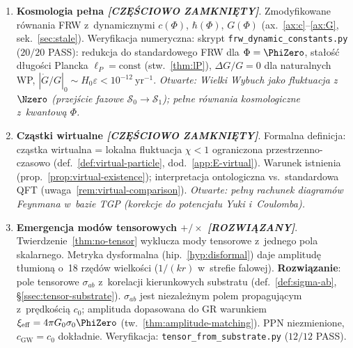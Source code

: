 \begin{enumerate}[label=\textbf{O\arabic*}., start=9, nosep]
  \item \textbf{Kosmologia pe\l{}na
        \emph{[CZ\k{E}\'SCIOWO ZAMKNI\k{E}TY]}}.
        Zmodyfikowane r\'ownania FRW z~dynamicznymi $c(\Phi)$,
        $\hbar(\Phi)$, $G(\Phi)$ (ax.~\ref{ax:c}--\ref{ax:G},
        sek.~\ref{sec:stale}).
        Weryfikacja numeryczna: skrypt
        \texttt{frw\_dynamic\_constants.py} ($20/20$ PASS):
        redukcja do standardowego FRW dla $\Phi=\PhiZero$,
        sta\l{}o\'s\'c d\l{}ugo\'sci Plancka $\ell_P = \mathrm{const}$
        (stw.~\ref{thm:lP}), $\Delta G/G = 0$ dla naturalnych WP,
        $|\dot G/G|_0 \sim H_0\varepsilon < 10^{-12}\ \mathrm{yr}^{-1}$.
        \emph{Otwarte: Wielki Wybuch jako fluktuacja z~$\Nzero$
        (przej\'scie fazowe $\mathcal{S}_0 \to \mathcal{S}_1$);
        pe\l{}ne r\'ownania kosmologiczne z~kwantow\k{a} $\Phi$.}

  \item \textbf{Cz\k{a}stki wirtualne
        \emph{[CZ\k{E}\'SCIOWO ZAMKNI\k{E}TY]}}.
        Formalna definicja: cz\k{a}stka wirtualna = lokalna fluktuacja
        $\chi < 1$ ograniczona przestrzenno-czasowo
        (def.~\ref{def:virtual-particle}, dod.~\ref{app:E-virtual}).
        Warunek istnienia (prop.~\ref{prop:virtual-existence});
        interpretacja ontologiczna vs.\ standardowa QFT
        (uwaga~\ref{rem:virtual-comparison}).
        \emph{Otwarte: pe\l{}ny rachunek diagram\'ow Feynmana
        w~bazie TGP (korekcje do potencja\l{}u Yuki i~Coulomba).}

  \item \textbf{Emergencja mod\'ow tensorowych $+/\times$
        \emph{[ROZWI\k{A}ZANY]}}.
        Twierdzenie~\ref{thm:no-tensor} wyklucza mody tensorowe
        z~jednego pola skalarnego. Metryka dysformalna
        (hip.~\ref{hyp:disformal}) daje amplitud\k{e} t\l{}umion\k{a}
        o~18 rz\k{e}d\'ow wielko\'sci ($1/(kr)$ w~strefie falowej).
        \textbf{Rozwi\k{a}zanie}: pole tensorowe $\sigma_{ab}$
        z~korelacji kierunkowych substratu
        (def.~\ref{def:sigma-ab}, \S\ref{ssec:tensor-substrate}).
        $\sigma_{ab}$ jest niezale\.znym polem propaguj\k{a}cym
        z~pr\k{e}dko\'sci\k{a} $c_0$; amplituda dopasowana do GR
        warunkiem $\xi_{\mathrm{eff}} = 4\pi G_0\sigma_0\PhiZero$
        (tw.~\ref{thm:amplitude-matching}). PPN niezmienione,
        $c_{\mathrm{GW}} = c_0$ dok\l{}adnie.
        Weryfikacja: \texttt{tensor\_from\_substrate.py} ($12/12$ PASS).


\end{enumerate}
